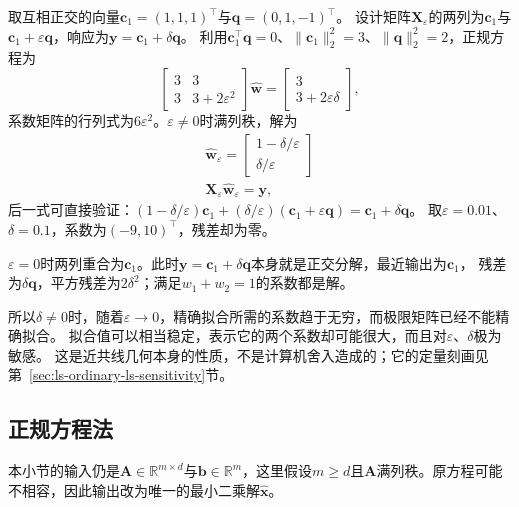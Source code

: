 \begin{example}
\label{ex:ls-nearly-collinear-design}
取互相正交的向量$\bm c_1=(1,1,1)^\top$与$\bm q=(0,1,-1)^\top$。
设计矩阵$\bm X_\varepsilon$的两列为$\bm c_1$与$\bm c_1+\varepsilon\bm q$，响应为$\bm y=\bm c_1+\delta\bm q$。
利用$\bm c_1^\top\bm q=0$、$\lVert\bm c_1\rVert_2^2=3$、$\lVert\bm q\rVert_2^2=2$，正规方程为
\[
 \begin{bmatrix}3&3\\3&3+2\varepsilon^2\end{bmatrix}\hat{\bm w}
 =\begin{bmatrix}3\\3+2\varepsilon\delta\end{bmatrix},
\]
系数矩阵的行列式为$6\varepsilon^2$。$\varepsilon\neq0$时满列秩，解为
\begin{equation}
\begin{gathered}
\hat{\bm w}_\varepsilon
 =\begin{bmatrix}1-\delta/\varepsilon\\\delta/\varepsilon\end{bmatrix}\\
\bm X_\varepsilon\hat{\bm w}_\varepsilon=\bm y,
\end{gathered}
\label{eq:linear-algebra-nearly-collinear-least-squares}
\end{equation}
后一式可直接验证：$(1-\delta/\varepsilon)\bm c_1+(\delta/\varepsilon)(\bm c_1+\varepsilon\bm q)=\bm c_1+\delta\bm q$。
取$\varepsilon=0.01$、$\delta=0.1$，系数为$(-9,10)^\top$，残差却为零。

$\varepsilon=0$时两列重合为$\bm c_1$。此时$\bm y=\bm c_1+\delta\bm q$本身就是正交分解，最近输出为$\bm c_1$，
残差为$\delta\bm q$，平方残差为$2\delta^2$；满足$w_1+w_2=1$的系数都是解。
\end{example}

所以$\delta\neq0$时，随着$\varepsilon\to0$，精确拟合所需的系数趋于无穷，而极限矩阵已经不能精确拟合。
拟合值可以相当稳定，表示它的两个系数却可能很大，而且对$\varepsilon$、$\delta$极为敏感。
这是近共线几何本身的性质，不是计算机舍入造成的；它的定量刻画见第~\ref{sec:ls-ordinary-ls-sensitivity}节。

\subsection{正规方程法}
\label{sec:ls-normal-equations-method}

本小节的输入仍是$\bm A\in\mathbb R^{m\times d}$与$\bm b\in\mathbb R^m$，这里假设$m\geq d$且$\bm A$满列秩。原方程可能不相容，因此输出改为唯一的最小二乘解$\hat{\bm x}$。

